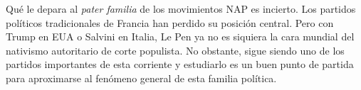 Qué le depara al \textit{pater familia} de los movimientos NAP es incierto. Los partidos políticos tradicionales de Francia han perdido su posición central. Pero con Trump en EUA o Salvini en Italia, Le Pen ya no es siquiera la cara mundial del nativismo autoritario de corte populista. No obstante, sigue siendo uno de los partidos importantes de esta corriente y estudiarlo es un buen punto de partida para aproximarse al fenómeno general de esta familia política. 


